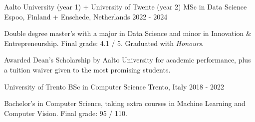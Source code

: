 
\begin{cventries}
  \cventry
    {Aalto University (year 1) + University of Twente (year 2)}
    {MSc in Data Science}
    {Espoo, Finland + Enschede, Netherlands}
    {2022 - 2024}
    {
      \begin{cvitems}
        \item {Double degree master's with a major in Data Science and minor in Innovation \& Entrepreneurship. Final grade: 4.1 / 5. Graduated with \textit{Honours}.}
        \item {Awarded Dean's Scholarship by Aalto University for academic performance, plus a tuition waiver given to the most promising students.}
      \end{cvitems}
    }
  \cventry
    {University of Trento}
    {BSc in Computer Science}
    {Trento, Italy}
    {2018 - 2022}
    {
      \begin{cvitems}
        \item {Bachelor's in Computer Science, taking extra courses in Machine Learning and Computer Vision. Final grade: 95 / 110.}
      \end{cvitems}
    }
\end{cventries}

